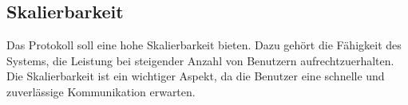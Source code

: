 \subsection{Skalierbarkeit}

Das Protokoll soll eine hohe Skalierbarkeit bieten. Dazu gehört die Fähigkeit des Systems, die
Leistung bei steigender Anzahl von Benutzern aufrechtzuerhalten. Die Skalierbarkeit ist ein
wichtiger Aspekt, da die Benutzer eine schnelle und zuverlässige Kommunikation erwarten.

